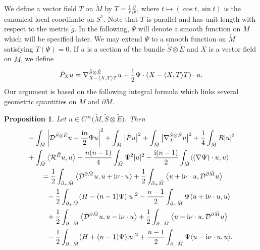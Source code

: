 \documentclass[11pt]{article}
\numberwithin{equation}{section}
\numberwithin{equation}{section}
\newtheorem{Proposition}[Theorem]{Proposition}
 { \theoremstyle{definition}
\newtheorem{Definition}[Theorem]{Definition}
\newtheorem{Note}[Theorem]{Note}
\newtheorem{Example}[Theorem]{Example}
\newtheorem{Remark}[Theorem]{Remark} }
\begin{document}
We define a vector field $T$ on $\tilde{M}$ by $T = \frac{1}{r} \frac{\partial}{\partial t}$, where $t \mapsto (\cos t,\sin t)$ is the canonical local coordinate on $S^1$. Note that $T$ is parallel and has unit length with respect to the metric $\tilde{g}$. In the following, $\Psi$ will denote a smooth function on $M$ which will be specified later. We may extend $\Psi$ to a smooth function on $\tilde{M}$ satisfying $T(\Psi) = 0$. If $u$ is a section of the bundle $\tilde{S} \otimes \tilde{E}$ and $X$ is a vector field on $\tilde{M}$, we define
\begin{equation} \label{def:tildeP}
\tilde{P}_X u = \nabla_{X - \langle X,T \rangle T}^{\tilde{S} \otimes \tilde{E}} u + \frac{\rm i}{2} \Psi \cdot (X - \langle X,T \rangle T) \cdot u.
\end{equation}
Our argument is based on the following integral formula which links several geometric quantities on $\tilde{M}$ and $\partial \tilde{M}$.

\begin{Proposition}
\label{integral_formula_even_dim}
Let $u \in C^\infty\big(\tilde{M},\tilde{S} \otimes \tilde{E}\big)$. Then
\begin{align*}
& - \int_{\tilde{M}} \left|\mathcal{D}^{\tilde{S} \otimes \tilde{E}} u - \frac{{\rm i}n}{2} \Psi u\right|^2 + \int_{\tilde{M}} \big|\tilde{P} u\big|^2 + \int_{\tilde{M}} \big|\nabla_T^{\tilde{S} \otimes \tilde{E}} u\big|^2 + \frac{1}{4} \int_{\tilde{M}} R |u|^2 \\
&+ \int_{\tilde{M}} \big\langle \mathcal{R}^{\tilde{E}} u,u \big\rangle + \frac{n(n-1)}{4} \int_{\tilde{M}} \Psi^2 |u|^2 - \frac{{\rm i}(n-1)}{2} \int_{\tilde{M}} \langle (\nabla \Psi) \cdot u,u \rangle \\
&\qquad= \frac{1}{2} \int_{\partial_+ \tilde{M}} \big\langle \mathcal{D}^{\partial \tilde{M}} u,u + {\rm i} \nu \cdot u \big\rangle + \frac{1}{2} \int_{\partial_+ \tilde{M}} \big\langle u + {\rm i} \nu \cdot u,\mathcal{D}^{\partial \tilde{M}} u \big\rangle \\
&\phantom{\qquad=}{} - \frac{1}{2} \int_{\partial_+ \tilde{M}} (H-(n-1)\Psi) |u|^2 - \frac{n-1}{2} \int_{\partial_+ \tilde{M}} \Psi \langle u + {\rm i} \nu \cdot u,u \rangle \\
&\phantom{\qquad=}{} + \frac{1}{2} \int_{\partial_- \tilde{M}} \big\langle \mathcal{D}^{\partial \tilde{M}} u,u - {\rm i} \nu \cdot u \big\rangle + \frac{1}{2} \int_{\partial_- \tilde{M}} \big\langle u - {\rm i} \nu \cdot u,\mathcal{D}^{\partial \tilde{M}} u \big\rangle \\
&\phantom{\qquad=}{} - \frac{1}{2} \int_{\partial_- \tilde{M}} (H+(n-1)\Psi) |u|^2 + \frac{n-1}{2} \int_{\partial_- \tilde{M}} \Psi \langle u - {\rm i} \nu \cdot u,u \rangle.
\end{align*}
\end{Proposition}
\end{document}
